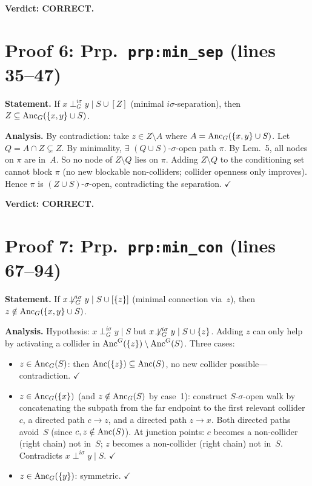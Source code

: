 \documentclass{article}
\begin{document}
\textbf{Verdict: CORRECT.}

\section{Proof 6: Prp.\ \texttt{prp:min\_sep} (lines 35--47)}

\textbf{Statement.} If $x\perp^{i\sigma}_G y\mid S\cup[Z]$ (minimal
$i\sigma$-separation), then $Z\subseteq\mathrm{Anc}_G(\{x,y\}\cup S)$.

\textbf{Analysis.}
By contradiction: take $z\in Z\setminus A$ where $A=\mathrm{Anc}_G(\{x,y\}\cup S)$.
Let $Q=A\cap Z\subsetneq Z$.  By minimality, $\exists$ $(Q\cup S)$-$\sigma$-open
path $\pi$.  By Lem.~5, all nodes on $\pi$ are in~$A$.  So no node
of $Z\setminus Q$ lies on $\pi$.  Adding $Z\setminus Q$ to the conditioning
set cannot block $\pi$ (no new blockable non-colliders; collider openness
only improves).  Hence $\pi$ is $(Z\cup S)$-$\sigma$-open, contradicting
the separation.  $\checkmark$

\textbf{Verdict: CORRECT.}

\section{Proof 7: Prp.\ \texttt{prp:min\_con} (lines 67--94)}

\textbf{Statement.} If $x\not\!\perp^{i\sigma}_G y\mid S\cup[\{z\}]$
(minimal connection via~$z$), then $z\notin\mathrm{Anc}_G(\{x,y\}\cup S)$.

\textbf{Analysis.}
Hypothesis: $x\perp^{i\sigma}_G y\mid S$ but
$x\not\!\perp^{i\sigma}_G y\mid S\cup\{z\}$.
Adding $z$ can only help by activating a collider in
$\mathrm{Anc}^G(\{z\})\setminus\mathrm{Anc}^G(S)$.
Three cases:
\begin{itemize}
  \item $z\in\mathrm{Anc}_G(S)$: then $\mathrm{Anc}(\{z\})\subseteq\mathrm{Anc}(S)$, no new
    collider possible---contradiction.  $\checkmark$
  \item $z\in\mathrm{Anc}_G(\{x\})$ (and $z\notin\mathrm{Anc}_G(S)$ by case~1):
    construct $S$-$\sigma$-open walk by concatenating the subpath from the
    far endpoint to the first relevant collider~$c$, a directed path
    $c\to z$, and a directed path $z\to x$.
    Both directed paths avoid~$S$ (since $c,z\notin\mathrm{Anc}(S)$).
    At junction points: $c$ becomes a non-collider (right chain) not in~$S$;
    $z$ becomes a non-collider (right chain) not in~$S$.
    Contradicts $x\perp^{i\sigma} y\mid S$.  $\checkmark$
  \item $z\in\mathrm{Anc}_G(\{y\})$: symmetric.  $\checkmark$
\end{itemize}
\end{document}
